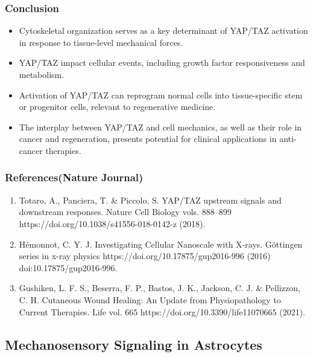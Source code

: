 \documentclass{article}
\begin{document}
\subsubsection{Conclusion}
\begin{itemize}
    \item Cytoskeletal organization serves as a key determinant of YAP/TAZ activation in response to tissue-level mechanical forces.
    \item YAP/TAZ impact cellular events, including growth factor responsiveness and metabolism.
    \item Activation of YAP/TAZ can reprogram normal cells into tissue-specific stem or progenitor cells, relevant to regenerative medicine.
    \item The interplay between YAP/TAZ and cell mechanics, as well as their role in cancer and regeneration, presents potential for clinical applications in anti-cancer therapies.
\end{itemize}
\subsubsection{References(Nature Journal)}
\begin{enumerate}
    \item Totaro, A., Panciera, T. \& Piccolo, S. YAP/TAZ upstream signals and downstream responses. Nature Cell Biology vols. 888–899 https://doi.org/10.1038/s41556-018-0142-z (2018).
    \item Hémonnot, C. Y. J. Investigating Cellular Nanoscale with X-rays. Göttingen series in x-ray physics https://doi.org/10.17875/gup2016-996 (2016) doi:10.17875/gup2016-996.
    \item Gushiken, L. F. S., Beserra, F. P., Bastos, J. K., Jackson, C. J. \& Pellizzon, C. H. Cutaneous Wound Healing: An Update from Physiopathology to Current Therapies. Life vol. 665 https://doi.org/10.3390/life11070665 (2021).
\end{enumerate}
\subsection{Mechanosensory Signaling in Astrocytes}
\end{document}

